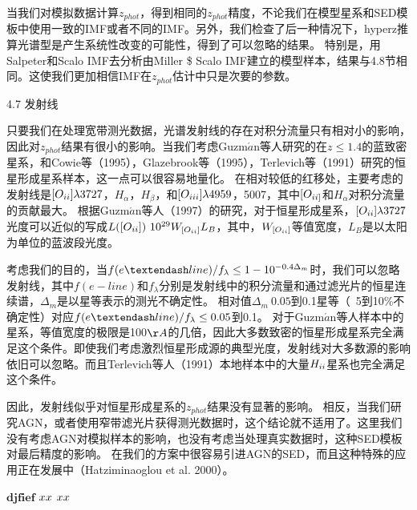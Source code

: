 \documentclass[8pt,a4paper,openany,twoside]{book}
\begin{document}
当我们对模拟数据计算$z_{phot}$，得到相同的$z_{phot}$精度，不论我们在模型星系和SED模板中使用一致的IMF或者不同的IMF。另外，我们检查了后一种情况下，hyperz推算光谱型是产生系统性改变的可能性，得到了可以忽略的结果。
特别是，用Salpeter和Scalo IMF去分析由Miller \$ Scalo IMF建立的模型样本，结果与4.8节相同。这使我们更加相信IMF在$z_{phot}$估计中只是次要的参数。
 
4.7 发射线
 
只要我们在处理宽带测光数据，光谱发射线的存在对积分流量只有相对小的影响，因此对$z_{phot}$结果有很小的影响。当我们考虑Guzm$\acute{a}$n等人研究的在$z\leq1.4$的蓝致密星系，和Cowie等（1995），Glazebrook等（1995），Terlevich等（1991）研究的恒星形成星系样本，这一点可以很容易地量化。
在相对较低的红移处，主要考虑的发射线是$[O_{\uppercase\expandafter{\romannumeral2}}]\lambda3727$，$H_\alpha$，$H_\beta$，和$[O_{\uppercase\expandafter{\romannumeral3}}]\lambda4959$，5007，其中$[O_{\uppercase\expandafter{\romannumeral2}]}$和$H_\alpha$对积分流量的贡献最大。
根据Guzm$\acute{a}$n等人（1997）的研究，对于恒星形成星系，$[O_{\uppercase\expandafter{\romannumeral2}}]\lambda3727$光度可以近似的写成$L([O_{\uppercase\expandafter{\romannumeral2}}])~10^{29} W_{[O_{\uppercase\expandafter{\romannumeral2}}]}L_B$，其中，$W_{[O_{\uppercase\expandafter{\romannumeral2}}]}$等值宽度，$L_B$是以太阳为单位的蓝波段光度。
 
考虑我们的目的，当$f(e\textendash line)/f_\lambda\leq1-10^{-0.4\Delta_m}$时，我们可以忽略发射线，其中$f(e-line)$和$f_\lambda$分别是发射线中的积分流量和通过滤光片的恒星连续谱，$\Delta_m$是以星等表示的测光不确定性。
相对值$\Delta_m~0.05$到0.1星等（~5到10\%不确定性）对应$f(e\textendash line)/f_\lambda\leq0.05$到0.1。
对于Guzm$\acute{a}$n等人样本中的星系，等值宽度的极限是100$\AA$的几倍，因此大多数致密的恒星形成星系完全满足这个条件。即使我们考虑激烈恒星形成源的典型光度，发射线对大多数源的影响依旧可以忽略。而且Terlevich等人（1991）本地样本中的大量$H_{\uppercase\expandafter{\romannumeral2}}$星系也完全满足这个条件。
 
因此，发射线似乎对恒星形成星系的$z_{phot}$结果没有显著的影响。
相反，当我们研究AGN，或者使用窄带滤光片获得测光数据时，这个结论就不适用了。这里我们没有考虑AGN对模拟样本的影响，也没有考虑当处理真实数据时，这种SED模板对最后精度的影响。
在我们的方案中很容易引进AGN的SED，而且这种特殊的应用正在发展中（Hatziminaoglou et al. 2000）。
 
$\mathbf{djfief}$%
$\romannumeral20$
$\uppercase\expandafter{\romannumeral20}$
 
\end{document}
